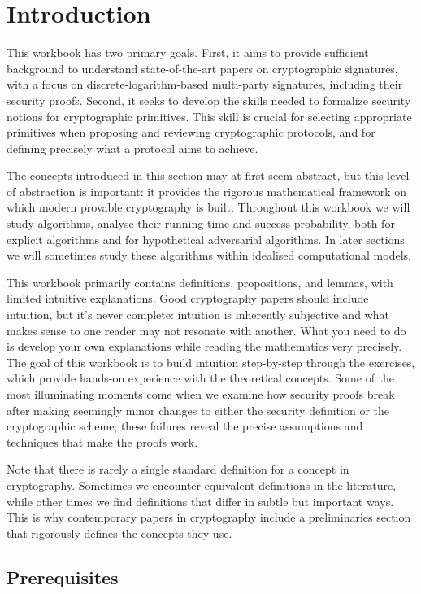 \section{Introduction}\label{sec:intro}

This workbook has two primary goals.
First, it aims to provide sufficient background to understand state-of-the-art papers on cryptographic signatures, with a focus on discrete-logarithm-based multi-party signatures, including their security proofs.
Second, it seeks to develop the skills needed to formalize security notions for cryptographic primitives.
This skill is crucial for selecting appropriate primitives when proposing and reviewing cryptographic protocols, and for defining precisely what a protocol aims to achieve.

The concepts introduced in this section may at first seem abstract, but this level of abstraction is important: it provides the rigorous mathematical framework on which modern provable cryptography is built.
Throughout this workbook we will study algorithms, analyse their running time and success probability, both for explicit algorithms and for hypothetical adversarial algorithms.
In later sections we will sometimes study these algorithms within idealised computational models.

This workbook primarily contains definitions, propositions, and lemmas, with limited intuitive explanations.
Good cryptography papers should include intuition, but it's never complete: intuition is inherently subjective and what makes sense to one reader may not resonate with another.
What you need to do is develop your own explanations while reading the mathematics very precisely.
The goal of this workbook is to build intuition step-by-step through the exercises, which provide hands-on experience with the theoretical concepts.
Some of the most illuminating moments come when we examine how security proofs break after making seemingly minor changes to either the security definition or the cryptographic scheme; these failures reveal the precise assumptions and techniques that make the proofs work.

Note that there is rarely a single standard definition for a concept in cryptography.
Sometimes we encounter equivalent definitions in the literature, while other times we find definitions that differ in subtle but important ways.
This is why contemporary papers in cryptography include a preliminaries section that rigorously defines the concepts they use.

\subsection{Prerequisites}

